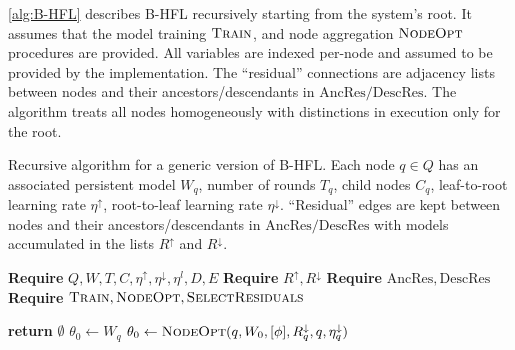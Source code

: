 \cref{alg:B-HFL} describes B-HFL recursively starting from the system's root. It assumes that the model training $\textsc{Train}$, and node aggregation $\textsc{NodeOpt}$ procedures are provided. All variables are indexed per-node and assumed to be provided by the implementation. The ``residual'' connections are adjacency lists between nodes and their ancestors/descendants in $\mathrm{AncRes}/\mathrm{DescRes}$. The algorithm treats all nodes homogeneously with distinctions in execution only for the root.

\begin{algorithm}[H]
    \caption[Bidirectional Hierarchical FL]{Recursive algorithm for a generic version of B-HFL. Each node $q \in Q$ has an associated persistent model $W_q$, number of rounds $T_q$, child nodes $C_q$, leaf-to-root learning rate $\eta^\uparrow$, root-to-leaf learning rate $\eta^\downarrow$. ``Residual'' edges are kept between nodes and their ancestors/descendants in $\mathrm{AncRes}/\mathrm{DescRes}$
        with models accumulated in the lists $R^\uparrow$ and $R^\downarrow$. }\label{alg:B-HFL}
    \begin{onehalfspace}

        \begin{algorithmic}[1]
            \State \textbf{Require} \(Q, W, T, C, \eta^\uparrow, \eta^\downarrow, \eta^l,D,E\) \label{alg:B-HFL:line:r0}
            \State \textbf{Require}  $R^{\uparrow},R^{\downarrow}$  \label{alg:B-HFL:line:r1}
            \State \textbf{Require}  $\mathrm{AncRes},\mathrm{DescRes} $  \label{alg:B-HFL:line:r2}
            \State \textbf{Require}  \(\textsc{Train} ,\textsc{NodeOpt}, \textsc{SelectResiduals}  \) \label{alg:B-HFL:line:r3}

              \label{alg:B-HFL:line:1}
            \textbf{return} $\emptyset$  \label{alg:B-HFL:line:2}
            \EndIf
            \State $\theta_0 \gets W_q$   \label{alg:B-HFL:line:3}
            \If{$\phi \neq \emptyset$} \label{alg:B-HFL:line:4}
            \State $\theta_0 \gets \Call{NodeOpt}{q,W_0,[\phi], R^\downarrow_q, q, \eta^\downarrow_q} $  \label{alg:B-HFL:line:5}
            \EndIf




\end{algorithmic}
\end{onehalfspace}
\end{algorithm}
